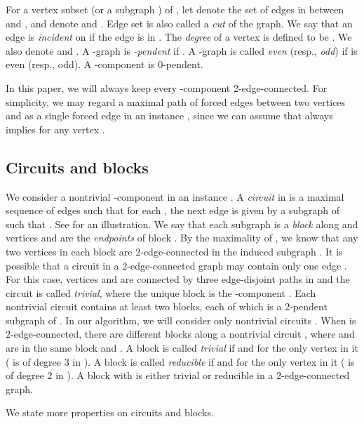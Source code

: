 \documentclass[runningheads]{llncs}
\begin{document}
For a vertex subset  (or a subgraph ) of ,
let  denote the set of edges in 
between  and ,
and denote  
and . Edge set  is also called a \emph{cut} of the graph.
We say that an edge is \emph{incident} on  if the edge is in .
The {\em degree}  of a vertex  is defined to be
.
We also denote 
and .
A -graph  is {\em -pendent} if .
A  -graph  is called  {\em even} (resp., {\em odd}) if   is even (resp., odd).
A -component is 0-pendent.

In this paper, we will always keep every -component 2-edge-connected.
For simplicity, we may regard a maximal path of
forced edges between two vertices  and 
as a single forced edge  in an instance , since we can assume that
  always implies  for any vertex .

\subsection{Circuits and blocks}
We consider a nontrivial -component  in an instance .
A {\em circuit}  in  is a maximal sequence
 of edges  
such that for each  ,
the next edge  is given
by a subgraph  of  such that
. See  for an illustration.
We say that each subgraph  is a \emph{block} along  and vertices  and  are the {\em endpoints} of block .
By the maximality of , we know that any two vertices in each block  are 2-edge-connected in the induced subgraph . It is possible that a circuit in a 2-edge-connected graph  may contain only one edge . For this case, vertices  and  are connected by three edge-disjoint paths in  and the circuit is called \emph{trivial}, where the unique block is the -component .
Each nontrivial circuit contains at least two blocks, each of which is a 2-pendent subgraph of .
In our algorithm, we will consider only nontrivial circuits .
When  is 2-edge-connected, there are  different blocks along a nontrivial circuit , where   and  are in the same block  and .
A block  is called {\em trivial} if  and  for the only vertex  in it ( is of degree 3 in ).
A block  is called {\em reducible} if  and  for the only vertex  in it ( is of degree 2 in ).
A block  with  is either trivial or reducible in a  2-edge-connected graph.

\vspace{-0mm}\vspace{-0mm}
We state more properties on circuits and blocks.


\end{document}
